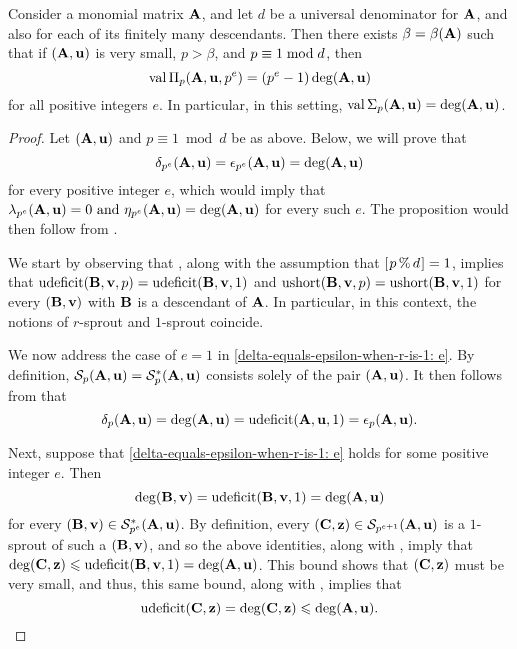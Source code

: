 \documentclass{amsart}
\begin{document}
\begin{proposition}
	\label{important-special: P}
   Consider a monomial matrix $\mathbf{A}$, and let $d$ be a universal denominator for $\mathbf{A}$, and also for each of its finitely many descendants.  Then there exists $\beta = \beta(\mathbf{A})$ such that if $(\mathbf{A}, \mathbf{u})$ is very small, $p>\beta$, and $p \equiv 1 \bmod d$, then
\[
 \operatorname{val}\Pi_p(\mathbf{A},\mathbf{u},p^e) = (p^e-1) \operatorname{deg}(\mathbf{A},\mathbf{u})
\]
for all positive integers  $e$.  In particular, in this setting,
$\operatorname{val} \Sigma_p (\mathbf{A},\mathbf{u}) = \operatorname{deg}(\mathbf{A},\mathbf{u})$.
	\end{proposition}

\begin{proof}  Let $(\mathbf{A}, \mathbf{u})$ and $p \equiv 1 \bmod d$ be as above.  Below, we will prove that 
\begin{equation}
\label{delta-equals-epsilon-when-r-is-1: e}
\delta_{p^e}(\mathbf{A}, \mathbf{u}) = \epsilon_{p^e}(\mathbf{A}, \mathbf{u}) = \deg(\mathbf{A}, \mathbf{u})
\end{equation}
for every positive integer $e$, which would imply that $\lambda_{p^e}(\mathbf{A}, \mathbf{u}) = 0 \text{ and } \eta_{p^e}(\mathbf{A}, \mathbf{u}) = \deg(\mathbf{A}, \mathbf{u})$ for every such $e$.  The proposition would then follow from . 

We start by observing that , along with the assumption that $[ \hspace{.01in} p \, \% \, d \hspace{.01in} ] = 1$,  implies that $\operatorname{udeficit}(\mathbf{B}, \mathbf{v}, p) = \operatorname{udeficit}(\mathbf{B}, \mathbf{v}, 1)$ and $\operatorname{ushort}(\mathbf{B}, \mathbf{v}, p) = \operatorname{ushort}(\mathbf{B}, \mathbf{v}, 1)$ for every $(\mathbf{B}, \mathbf{v})$ with $\mathbf{B}$ is a descendant of $\mathbf{A}$.  In particular, in this context, the notions of $r$-sprout and $1$-sprout coincide. 

We now address the case of $e=1$ in \eqref{delta-equals-epsilon-when-r-is-1: e}.  By definition, $\mathcal{S}_p(\mathbf{A}, \mathbf{u}) = \mathcal{S}_p^{\ast}(\mathbf{A}, \mathbf{u})$ consists solely of the pair $(\mathbf{A}, \mathbf{u})$.  It then follows from  that
\[ \delta_p(\mathbf{A}, \mathbf{u}) = \deg(\mathbf{A}, \mathbf{u}) = \operatorname{udeficit}(\mathbf{A}, \mathbf{u}, 1) = \epsilon_p(\mathbf{A}, \mathbf{u}).\] 

Next, suppose that \eqref{delta-equals-epsilon-when-r-is-1: e} holds for some positive integer $e$.  Then
\[ \deg(\mathbf{B}, \mathbf{v}) = \operatorname{udeficit}(\mathbf{B}, \mathbf{v}, 1) = \deg(\mathbf{A}, \mathbf{u}) \] 
 for every $(\mathbf{B}, \mathbf{v}) \in \mathcal{S}_{p^e}^{\ast}(\mathbf{A}, \mathbf{u})$.  By definition, every $(\mathbf{C}, \mathbf{z}) \in \mathcal{S}_{p^{e+1}}(\mathbf{A}, \mathbf{u})$ is a $1$-sprout of such a $(\mathbf{B}, \mathbf{v})$, and so the above identities, along with , imply that
$\deg(\mathbf{C}, \mathbf{z}) \leqslant \operatorname{udeficit}(\mathbf{B}, \mathbf{v}, 1) = \deg(\mathbf{A}, \mathbf{u})$.  This bound shows that $(\mathbf{C}, \mathbf{z})$ must be very small, and thus, this same bound, along with , implies that
\begin{equation}
\label{describing-next-level-of-graph-p-congruent-to-1: e}
 \operatorname{udeficit}(\mathbf{C}, \mathbf{z}) = \deg(\mathbf{C}, \mathbf{z}) \leqslant \deg(\mathbf{A}, \mathbf{u}).
\end{equation}


\end{proof}
\end{document}
